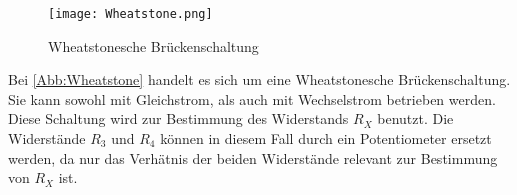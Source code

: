\begin{figure}
    \centering
    \texttt{[image: Wheatstone.png]}
    \caption{Wheatstonesche Brückenschaltung}
    \label{Abb:Wheatstone}
\end{figure}

Bei \autoref{Abb:Wheatstone} handelt es sich um eine Wheatstonesche Brückenschaltung. Sie kann sowohl mit Gleichstrom, als auch mit Wechselstrom betrieben werden.
Diese Schaltung wird zur Bestimmung des Widerstands $R_X$ benutzt. Die Widerstände $R_3$ und $R_4$ können in diesem Fall durch ein Potentiometer ersetzt werden,
da nur das Verhätnis der beiden Widerstände relevant zur Bestimmung von $R_X$ ist. \\


\cite{sample}